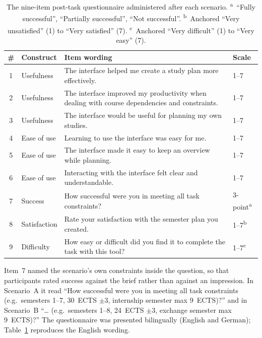 \begin{table}[!htbp]
    \centering
    \small
    \begin{tabular}{clp{7.6cm}l}
        \toprule
        \# & Construct & Item wording & Scale \\
        \midrule
        1 & Usefulness   & The interface helped me create a study plan more effectively. & 1--7 \\
        2 & Usefulness   & The interface improved my productivity when dealing with course dependencies and constraints. & 1--7 \\
        3 & Usefulness   & The interface would be useful for planning my own studies. & 1--7 \\
        4 & Ease of use  & Learning to use the interface was easy for me. & 1--7 \\
        5 & Ease of use  & The interface made it easy to keep an overview while planning. & 1--7 \\
        6 & Ease of use  & Interacting with the interface felt clear and understandable. & 1--7 \\
        7 & Success      & How successful were you in meeting all task constraints? & 3-point\textsuperscript{a} \\
        8 & Satisfaction & Rate your satisfaction with the semester plan you created. & 1--7\textsuperscript{b} \\
        9 & Difficulty   & How easy or difficult did you find it to complete the task with this tool? & 1--7\textsuperscript{c} \\
        \bottomrule
    \end{tabular}
    \caption{The nine-item post-task questionnaire administered after each scenario. \textsuperscript{a}~\enquote{Fully successful}, \enquote{Partially successful}, \enquote{Not successful}. \textsuperscript{b}~Anchored \enquote{Very unsatisfied} (1) to \enquote{Very satisfied} (7). \textsuperscript{c}~Anchored \enquote{Very difficult} (1) to \enquote{Very easy} (7).}
    \label{tab:app-perscenario-instrument}
\end{table}
Item~7 named the scenario's own constraints inside the question, so that participants rated success against the brief rather than against an impression. In Scenario~A it read \enquote{How successful were you in meeting all task constraints (e.g.\ semesters 1--7, 30~ECTS $\pm$3, internship semester max 9~ECTS)?} and in Scenario~B \enquote{\ldots{} (e.g.\ semesters 1--8, 24~ECTS $\pm$3, exchange semester max 9~ECTS)?} The questionnaire was presented bilingually (English and German); Table~\ref{tab:app-perscenario-instrument} reproduces the English wording.

